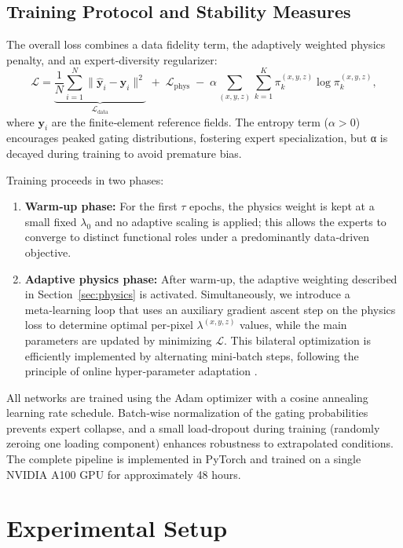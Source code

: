 \documentclass{article}
\begin{document}
\subsection{Training Protocol and Stability Measures}
\label{sec:training}

The overall loss combines a data fidelity term, the adaptively weighted physics penalty, and an expert‑diversity regularizer:
\begin{equation}
  \mathcal{L} = \underbrace{\frac{1}{N}\sum_{i=1}^N \|\hat{\mathbf{y}}_i - \mathbf{y}_i\|^2}_{\mathcal{L}_{\text{data}}} \;+\; \mathcal{L}_{\text{phys}} \;-\; \alpha \sum_{(x,y,z)} \sum_{k=1}^K \pi_k^{(x,y,z)} \log \pi_k^{(x,y,z)},
\end{equation}
where \(\mathbf{y}_i\) are the finite‑element reference fields. The entropy term (\(\alpha>0\)) encourages peaked gating distributions, fostering expert specialization, but α is decayed during training to avoid premature bias.

Training proceeds in two phases:
\begin{enumerate}
  \item \textbf{Warm‑up phase:} For the first \(\tau\) epochs, the physics weight is kept at a small fixed \(\lambda_0\) and no adaptive scaling is applied; this allows the experts to converge to distinct functional roles under a predominantly data‑driven objective.
  \item \textbf{Adaptive physics phase:} After warm‑up, the adaptive weighting described in Section~\ref{sec:physics} is activated. Simultaneously, we introduce a meta‑learning loop that uses an auxiliary gradient ascent step on the physics loss to determine optimal per‑pixel \(\lambda^{(x,y,z)}\) values, while the main parameters are updated by minimizing \(\mathcal{L}\). This bilateral optimization is efficiently implemented by alternating mini‑batch steps, following the principle of online hyper‑parameter adaptation \cite{finn_modelagnostic_2017}.
\end{enumerate}
All networks are trained using the Adam optimizer with a cosine annealing learning rate schedule. Batch‑wise normalization of the gating probabilities prevents expert collapse, and a small load‑dropout during training (randomly zeroing one loading component) enhances robustness to extrapolated conditions. The complete pipeline is implemented in PyTorch and trained on a single NVIDIA A100 GPU for approximately 48 hours.

\section{Experimental Setup}
\end{document}
